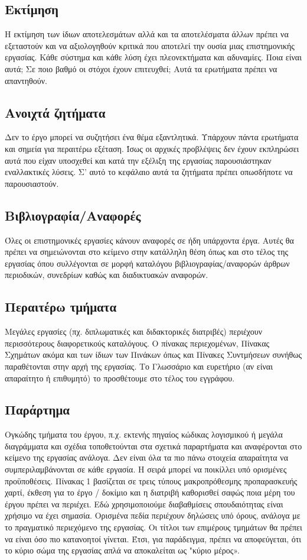 \subsection{Εκτίμηση}
Η εκτίμηση των ίδιων αποτελεσμάτων αλλά και τα αποτελέσματα άλλων πρέπει να εξεταστούν και να αξιολογηθούν κριτικά που αποτελεί την ουσία  μιας επιστημονικής εργασίας. Κάθε σύστημα και κάθε λύση έχει πλεονεκτήματα και αδυναμίες. Ποια είναι αυτά; Σε ποιο βαθμό οι στόχοι έχουν επιτευχθεί; Αυτά τα ερωτήματα πρέπει να απαντηθούν.
\subsection{Ανοιχτά ζητήματα}
Δεν το έργο μπορεί να συζητήσει ένα θέμα εξαντλητικά. Υπάρχουν πάντα ερωτήματα και  σημεία για περαιτέρω εξέταση. Ίσως οι αρχικές προβλέψεις δεν έχουν εκπληρώσει αυτά που είχαν υποσχεθεί και κατά την εξέλιξη της εργασίας παρουσιάστηκαν εναλλακτικές λύσεις. Σ' αυτό το κεφάλαιο αυτά τα ζητήματα πρέπει οπωσδήποτε να παρουσιαστούν.
\subsection{Βιβλιογραφία/Αναφορές}
Όλες οι επιστημονικές εργασίες κάνουν αναφορές σε ήδη υπάρχοντα έργα.
Αυτές θα πρέπει να σημειώνονται στο κείμενο στην κατάλληλη θέση όπως και στο τέλος της εργασίας  όπου συλλέγονται σε μορφή καταλόγου βιβλιογραφίας/αναφορών άρθρων περιοδικών, συνεδρίων καθώς και διαδικτυακών αναφορών.
\subsection{Περαιτέρω τμήματα}
Μεγάλες εργασίες (πχ. διπλωματικές και διδακτορικές διατριβές) περιέχουν περισσότερους  διαφορετικούς καταλόγους. Ο πίνακας περιεχομένων, Πίνακας Σχημάτων ακόμα και των ίδιων των Πινάκων όπως και Πίνακες Συντμήσεων συνήθως παραθέτονται στην αρχή της εργασίας. Το Γλωσσάριο και ευρετήριο (αν είναι απαραίτητο ή επιθυμητό) το προσθέτουμε στο τέλος του εγγράφου.
\subsection{Παράρτημα}
Ογκώδης τμήματα του έργου, π.χ. εκτενής πηγαίος κώδικας λογισμικού ή μεγάλα διαγράμματα και σχέδια τοποθετούνται στα σχετικά παραρτήματα και αναφέρονται στο κείμενο της εργασίας ανάλογα.
Δεν είναι όλα τα πιο πάνω στοιχεία απαραίτητα να συμπεριλαμβάνονται σε κάθε εργασία. Η σειρά μπορεί να ποικίλλει υπό ορισμένες προϋποθέσεις. Πίνακας 1 βασίζεται σε τρεις τύπους μακροπρόθεσμης προπαρασκευής χαρτί, έκθεση για το έργο / δοκίμιο και η διατριβή καθορισθεί σαφώς ποια μέρη του έργου πρέπει να περιέχει. Εδώ χρησιμοποιούμε διαβαθμίσεις σπουδαιότητας είναι χρήσιμο να έχει σημασία. Ορισμένα πεδία περιέχουν δηλώσεις υπό όρους, ανάλογα με το πραγματικό περιεχόμενο της εργασίας. 
Οι τίτλοι των επιμέρους τμημάτων θα πρέπει να είναι όσο πιο κατανοητοί γίνεται. Έτσι, για παράδειγμα, πρέπει να αποφεύγεται, ότι το κύριο σώμα της εργασίας απλά να αποκαλείται ως "κύριο μέρος».

